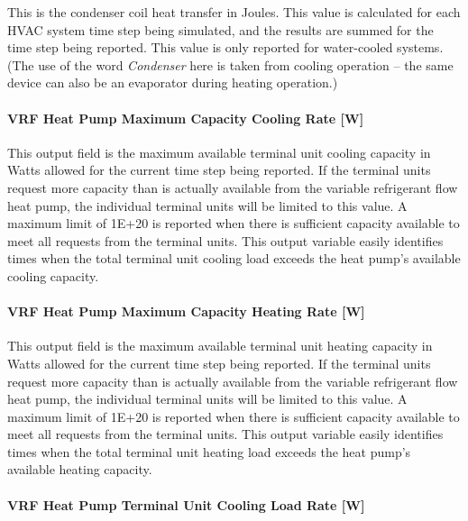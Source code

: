 This is the condenser coil heat transfer in Joules. This value is calculated for each HVAC system time step being simulated, and the results are summed for the time step being reported. This value is only reported for water-cooled systems. (The use of the word \emph{Condenser} here is taken from cooling operation -- the same device can also be an evaporator during heating operation.)

\paragraph{VRF Heat Pump Maximum Capacity Cooling Rate {[}W{]}}\label{vrf-heat-pump-maximum-capacity-cooling-rate-w}

This output field is the maximum available terminal unit cooling capacity in Watts allowed for the current time step being reported. If the terminal units request more capacity than is actually available from the variable refrigerant flow heat pump, the individual terminal units will be limited to this value. A maximum limit of 1E+20 is reported when there is sufficient capacity available to meet all requests from the terminal units. This output variable easily identifies times when the total terminal unit cooling load exceeds the heat pump's available cooling capacity.

\paragraph{VRF Heat Pump Maximum Capacity Heating Rate {[}W{]}}\label{vrf-heat-pump-maximum-capacity-heating-rate-w}

This output field is the maximum available terminal unit heating capacity in Watts allowed for the current time step being reported. If the terminal units request more capacity than is actually available from the variable refrigerant flow heat pump, the individual terminal units will be limited to this value. A maximum limit of 1E+20 is reported when there is sufficient capacity available to meet all requests from the terminal units. This output variable easily identifies times when the total terminal unit heating load exceeds the heat pump's available heating capacity.

\paragraph{VRF Heat Pump Terminal Unit Cooling Load Rate {[}W{]}}\label{vrf-heat-pump-terminal-unit-cooling-load-rate-w}

